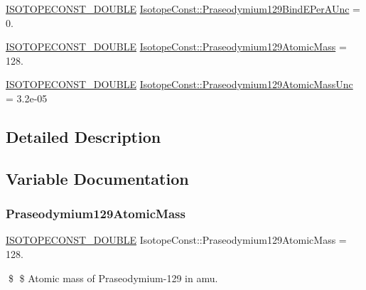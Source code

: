 \begin{DoxyCompactItemize}
\item 
\mbox{\hyperlink{group___isotope_const-_macros_ga8f45a7272ce02c0b4c65c44636ed719a}{I\+S\+O\+T\+O\+P\+E\+C\+O\+N\+S\+T\+\_\+\+D\+O\+U\+B\+LE}} \mbox{\hyperlink{group___isotope_const-_praseodymium-_pr129_gab23692a827e4657736a1a0b8b76eddab}{Isotope\+Const\+::\+Praseodymium129\+Bind\+E\+Per\+A\+Unc}} = 0.
\item 
\mbox{\hyperlink{group___isotope_const-_macros_ga8f45a7272ce02c0b4c65c44636ed719a}{I\+S\+O\+T\+O\+P\+E\+C\+O\+N\+S\+T\+\_\+\+D\+O\+U\+B\+LE}} \mbox{\hyperlink{group___isotope_const-_praseodymium-_pr129_ga97726c0d447d10a8eeb6b690af94af42}{Isotope\+Const\+::\+Praseodymium129\+Atomic\+Mass}} = 128.
\item 
\mbox{\hyperlink{group___isotope_const-_macros_ga8f45a7272ce02c0b4c65c44636ed719a}{I\+S\+O\+T\+O\+P\+E\+C\+O\+N\+S\+T\+\_\+\+D\+O\+U\+B\+LE}} \mbox{\hyperlink{group___isotope_const-_praseodymium-_pr129_ga6b9ee4a7193e6096e48db0b49718b03d}{Isotope\+Const\+::\+Praseodymium129\+Atomic\+Mass\+Unc}} = 3.\+2e-\/05
\end{DoxyCompactItemize}


\subsection{Detailed Description}


\subsection{Variable Documentation}
\mbox{\label{group___isotope_const-_praseodymium-_pr129_ga97726c0d447d10a8eeb6b690af94af42}} 
\subsubsection{\texorpdfstring{Praseodymium129\+Atomic\+Mass}{Praseodymium129AtomicMass}}
{\footnotesize\ttfamily \mbox{\hyperlink{group___isotope_const-_macros_ga8f45a7272ce02c0b4c65c44636ed719a}{I\+S\+O\+T\+O\+P\+E\+C\+O\+N\+S\+T\+\_\+\+D\+O\+U\+B\+LE}} Isotope\+Const\+::\+Praseodymium129\+Atomic\+Mass = 128.}

\$ \$ Atomic mass of Praseodymium-\/129 in amu. \mbox{\label{group___isotope_const-_praseodymium-_pr129_ga6b9ee4a7193e6096e48db0b49718b03d}} 
